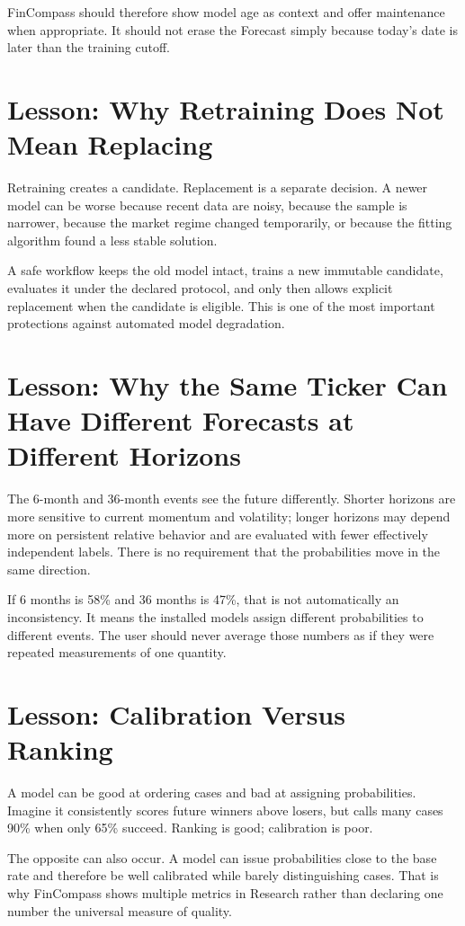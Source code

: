 \documentclass[11pt]{article}
\begin{document}
FinCompass should therefore show model age as context and offer maintenance when appropriate. It should not erase the Forecast simply because today's date is later than the training cutoff.

\section{Lesson: Why Retraining Does Not Mean Replacing}
Retraining creates a candidate. Replacement is a separate decision. A newer model can be worse because recent data are noisy, because the sample is narrower, because the market regime changed temporarily, or because the fitting algorithm found a less stable solution.

A safe workflow keeps the old model intact, trains a new immutable candidate, evaluates it under the declared protocol, and only then allows explicit replacement when the candidate is eligible. This is one of the most important protections against automated model degradation.

\section{Lesson: Why the Same Ticker Can Have Different Forecasts at Different Horizons}
The 6-month and 36-month events see the future differently. Shorter horizons are more sensitive to current momentum and volatility; longer horizons may depend more on persistent relative behavior and are evaluated with fewer effectively independent labels. There is no requirement that the probabilities move in the same direction.

If 6 months is 58\% and 36 months is 47\%, that is not automatically an inconsistency. It means the installed models assign different probabilities to different events. The user should never average those numbers as if they were repeated measurements of one quantity.

\section{Lesson: Calibration Versus Ranking}
A model can be good at ordering cases and bad at assigning probabilities. Imagine it consistently scores future winners above losers, but calls many cases 90\% when only 65\% succeed. Ranking is good; calibration is poor.

The opposite can also occur. A model can issue probabilities close to the base rate and therefore be well calibrated while barely distinguishing cases. That is why FinCompass shows multiple metrics in Research rather than declaring one number the universal measure of quality.
\end{document}

